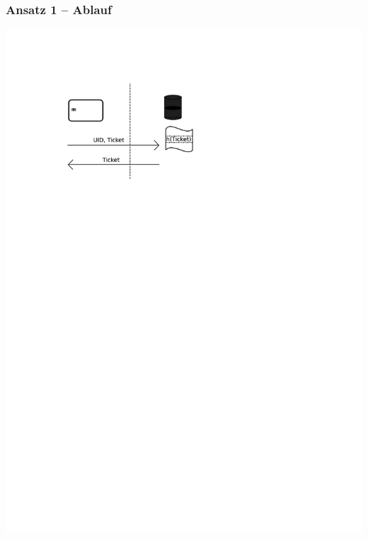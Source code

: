 \begin{frame}
	\frametitle{Ansatz 1 -- Ablauf}
\includegraphics[scale=0.75]{ansatz1ablauf.pdf}
\end{frame}
